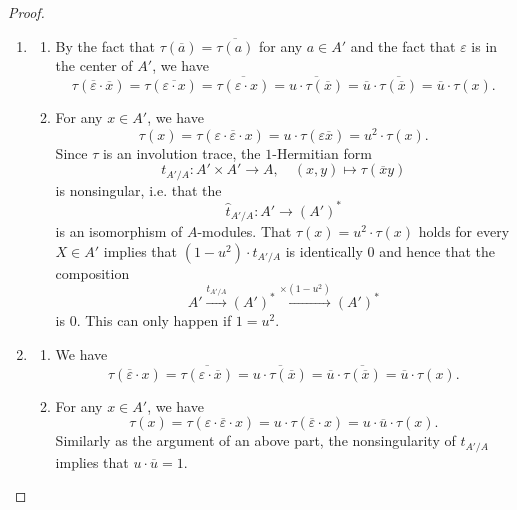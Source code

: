\begin{proof}
    \begin{enumerate}
        \item 
        \begin{enumerate}
            \item By the fact that $\tau(\overline{a}) = \overline{\tau(a)}$ for any $a \in A'$ and the fact that $\varepsilon$ is in the center of $A'$, we have 
            $$\tau(\overline{\varepsilon} \cdot \overline{x}) = \tau(\overline{\varepsilon \cdot x}) = \overline{\tau(\varepsilon \cdot x)} = \overline{u \cdot \tau(\overline{x})} = \overline{u} \cdot \overline{\tau(\overline{x})} = \overline{u} \cdot \tau(x).$$

            \item For any $x \in A'$, we have 
            $$\tau(x) = \tau(\varepsilon \cdot \overline{\varepsilon} \cdot x) = u \cdot \tau(\varepsilon \overline{x}) = u^2 \cdot \tau(x).$$
            Since $\tau$ is an involution trace, the $1$-Hermitian form 
            $$t_{A'/A}: A' \times A' \to A, \quad (x,y) \mapsto \tau(\overline{x} y)$$
            is nonsingular, i.e. that the 
            $$\widehat{t}_{A'/A}: A' \to (A')^*$$
            is an isomorphism of $A$-modules. That $\tau(x) = u^2 \cdot \tau(x)$ holds for every $X \in A'$ implies that $(1-u^2) \cdot t_{A'/A}$ is identically $0$ and hence that the composition
            $$A' \xrightarrow{t_{A'/A}} (A')^* \xrightarrow{ \times (1-u^2)} (A')^*$$
            is $0$. This can only happen if $1 = u^2$.
        \end{enumerate}

        \item 
        \begin{enumerate}
            \item We have 
            $$\tau(\overline{\varepsilon} \cdot x) = \overline{\tau(\varepsilon \cdot \overline{x})} = \overline{u \cdot \tau(\overline{x})} = \overline{u} \cdot \overline{\tau(\overline{x})} = \overline{u} \cdot \tau(x).$$
            \item For any $x \in A'$, we have 
            $$\tau(x) = \tau(\varepsilon \cdot \overline{\varepsilon} \cdot x) = u \cdot \tau(\overline{\varepsilon} \cdot x) = u \cdot \overline{u} \cdot \tau(x).$$
            Similarly as the argument of an above part, the nonsingularity of $t_{A'/A}$ implies that $u \cdot \overline{u} = 1$.
        \end{enumerate}
    \end{enumerate}
\end{proof}
